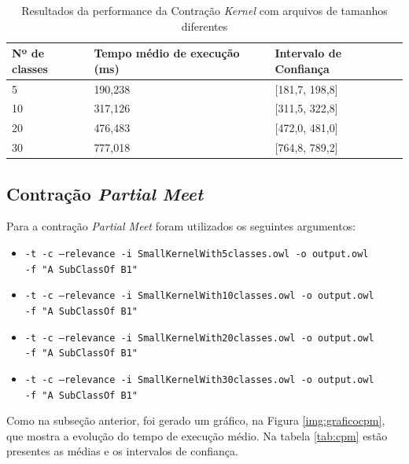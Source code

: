\begin{table}[H]
	\centering
	\begin{tabular}{|l|l|l|}
		\hline
		\textbf{Nº de classes}  & \textbf{Tempo médio de execução (ms)} & \textbf{Intervalo de Confiança} \\ \hline
		5                                                 & 190,238                          & {[}181,7, 198,8{]}              \\ \hline
		10                                                & 317,126                          & {[}311,5, 322,8{]}              \\ \hline
		20                                                & 476,483                          & {[}472,0, 481,0{]}              \\ \hline
		30                                                & 777,018                          & {[}764,8, 789,2{]}              \\ \hline
	\end{tabular}
	\caption{Resultados da performance da Contração \textit{Kernel} com arquivos de tamanhos diferentes}
	\label{tab:ck}
\end{table}

\subsection{Contração \textit{Partial Meet}}

Para a contração \textit{Partial Meet} foram utilizados os seguintes argumentos:

\begin{itemize}
	\item \texttt{-t -c --relevance -i SmallKernelWith5classes.owl -o output.owl \\ -f "A SubClassOf B1"}
	\item \texttt{-t -c --relevance -i SmallKernelWith10classes.owl -o output.owl \\ -f "A SubClassOf B1"}
	\item \texttt{-t -c --relevance -i SmallKernelWith20classes.owl -o output.owl \\ -f "A SubClassOf B1"}
	\item \texttt{-t -c --relevance -i SmallKernelWith30classes.owl -o output.owl \\ -f "A SubClassOf B1"}
\end{itemize}

Como na subseção anterior, foi gerado um gráfico, na Figura \ref{img:graficocpm}, que mostra a evolução do tempo de execução médio. Na tabela \ref{tab:cpm} estão presentes as médias e os intervalos de confiança.

